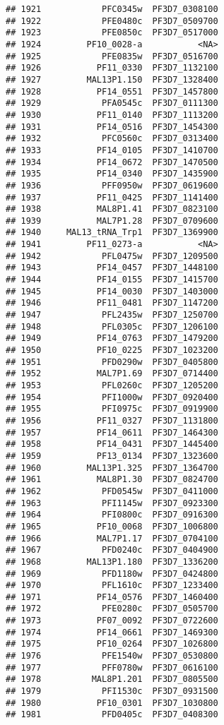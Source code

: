 \documentclass[12pt, a4paper]{article}\usepackage[]{graphicx}\usepackage[]{color}
\makeatletter
\newenvironment{kframe}{%
 \def\at@end@of@kframe{}%
 \ifinner\ifhmode%
  \def\at@end@of@kframe{\end{minipage}}%
  \begin{minipage}{\columnwidth}%
 \fi\fi%
 \def\FrameCommand##1{\hskip\@totalleftmargin \hskip-\fboxsep
 \colorbox{shadecolor}{##1}\hskip-\fboxsep
     \hskip-\linewidth \hskip-\@totalleftmargin \hskip\columnwidth}%
 \MakeFramed {\advance\hsize-\width
   \@totalleftmargin\z@ \linewidth\hsize
   \@setminipage}}%
 {\par\unskip\endMakeFramed%
 \at@end@of@kframe}
\newenvironment{knitrout}{}{} %
\makeatother
\begin{document}
\begin{knitrout}
\begin{kframe}
\begin{verbatim}
## 1921            PFC0345w  PF3D7_0308100
## 1922            PFE0480c  PF3D7_0509700
## 1923            PFE0850c  PF3D7_0517000
## 1924         PF10_0028-a           <NA>
## 1925            PFE0835w  PF3D7_0516700
## 1926           PF11_0330  PF3D7_1132100
## 1927         MAL13P1.150  PF3D7_1328400
## 1928           PF14_0551  PF3D7_1457800
## 1929            PFA0545c  PF3D7_0111300
## 1930           PF11_0140  PF3D7_1113200
## 1931           PF14_0516  PF3D7_1454300
## 1932            PFC0560c  PF3D7_0313400
## 1933           PF14_0105  PF3D7_1410700
## 1934           PF14_0672  PF3D7_1470500
## 1935           PF14_0340  PF3D7_1435900
## 1936            PFF0950w  PF3D7_0619600
## 1937           PF11_0425  PF3D7_1141400
## 1938           MAL8P1.41  PF3D7_0823100
## 1939           MAL7P1.28  PF3D7_0709600
## 1940     MAL13_tRNA_Trp1  PF3D7_1369900
## 1941         PF11_0273-a           <NA>
## 1942            PFL0475w  PF3D7_1209500
## 1943           PF14_0457  PF3D7_1448100
## 1944           PF14_0155  PF3D7_1415700
## 1945           PF14_0030  PF3D7_1403000
## 1946           PF11_0481  PF3D7_1147200
## 1947            PFL2435w  PF3D7_1250700
## 1948            PFL0305c  PF3D7_1206100
## 1949           PF14_0763  PF3D7_1479200
## 1950           PF10_0225  PF3D7_1023200
## 1951            PFD0290w  PF3D7_0405800
## 1952           MAL7P1.69  PF3D7_0714400
## 1953            PFL0260c  PF3D7_1205200
## 1954            PFI1000w  PF3D7_0920400
## 1955            PFI0975c  PF3D7_0919900
## 1956           PF11_0327  PF3D7_1131800
## 1957           PF14_0611  PF3D7_1464300
## 1958           PF14_0431  PF3D7_1445400
## 1959           PF13_0134  PF3D7_1323600
## 1960         MAL13P1.325  PF3D7_1364700
## 1961           MAL8P1.30  PF3D7_0824700
## 1962            PFD0545w  PF3D7_0411000
## 1963            PFI1145w  PF3D7_0923300
## 1964            PFI0800c  PF3D7_0916300
## 1965           PF10_0068  PF3D7_1006800
## 1966           MAL7P1.17  PF3D7_0704100
## 1967            PFD0240c  PF3D7_0404900
## 1968         MAL13P1.180  PF3D7_1336200
## 1969            PFD1180w  PF3D7_0424800
## 1970            PFL1610c  PF3D7_1233400
## 1971           PF14_0576  PF3D7_1460400
## 1972            PFE0280c  PF3D7_0505700
## 1973           PF07_0092  PF3D7_0722600
## 1974           PF14_0661  PF3D7_1469300
## 1975           PF10_0264  PF3D7_1026800
## 1976            PFE1540w  PF3D7_0530800
## 1977            PFF0780w  PF3D7_0616100
## 1978          MAL8P1.201  PF3D7_0805500
## 1979            PFI1530c  PF3D7_0931500
## 1980           PF10_0301  PF3D7_1030800
## 1981            PFD0405c  PF3D7_0408300

\end{verbatim}
\end{kframe}
\end{knitrout}
\end{document}
